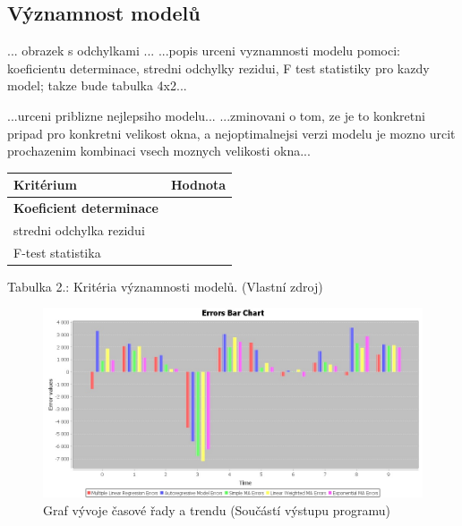 \documentclass[a4paper,12pt,twoside]{scrreprt}
\begin{document}
\subsection{Významnost modelů}

... obrazek s odchylkami ...
\newline...popis urceni vyznamnosti modelu pomoci: koeficientu determinace, stredni odchylky rezidui, F test statistiky pro kazdy model; takze bude tabulka 4x2...

...urceni priblizne nejlepsiho modelu...		
\newline...zminovani o tom, ze je to konkretni pripad pro konkretni velikost okna, a nejoptimalnejsi verzi modelu je mozno urcit prochazenim kombinaci vsech moznych velikosti okna...

\vspace*{0.5cm}

\begin{tabular}{|l|p{8cm}|}
  \hline
  {\bf Kritérium} & {\bf Hodnota} \\
  \hline 
   {\bf Koeficient determinace}        &  \\ 
  \hline
   stredni odchylka rezidui &  \\
  \hline
  F-test statistika  &  \\
 \hline
\end{tabular}

\vspace*{0.3cm}

Tabulka 2.: Kritéria významnosti modelů. (Vlastní zdroj)

\newpage
 
\begin{figure}[h]
  \centering
  \includegraphics[width=15cm]{pictures/grafy/ErrorsBarChart.jpeg}
  \caption{Graf vývoje časové řady a trendu \newline(Součástí výstupu programu)}
  \label{fig:regrese}
\end{figure}
\end{document}
